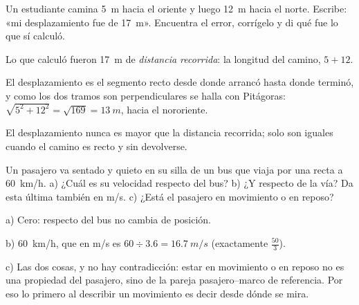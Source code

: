 \documentclass[11pt]{article}
\begin{document}
\begin{preguntas}
\pregunta[1.25] Un estudiante camina \qty{5}{m} hacia el oriente y luego \qty{12}{m} hacia el
norte. Escribe: «mi desplazamiento fue de \qty{17}{m}». Encuentra el error, corrígelo y di qué
fue lo que sí calculó.
\begin{solucion}[4.5cm]
Lo que calculó fueron \qty{17}{m} de \emph{distancia recorrida}: la longitud del camino,
$5 + 12$.

El desplazamiento es el segmento recto desde donde arrancó hasta donde terminó, y como los dos
tramos son perpendiculares se halla con Pitágoras:
$\sqrt{5^2 + 12^2} = \sqrt{169} = \qty{13}{m}$, hacia el nororiente.

El desplazamiento nunca es mayor que la distancia recorrida; solo son iguales cuando el camino
es recto y sin devolverse.
\end{solucion}

\pregunta[1] Un pasajero va sentado y quieto en su silla de un bus que viaja por una recta a
\qty{60}{km/h}. a) ¿Cuál es su velocidad respecto del bus? b) ¿Y respecto de la vía? Da esta
última también en \unit{m/s}. c) ¿Está el pasajero en movimiento o en reposo?
\begin{solucion}[4.5cm]
a) Cero: respecto del bus no cambia de posición.

b) \qty{60}{km/h}, que en \unit{m/s} es $60 \div \num{3,6} = \qty{16,7}{m/s}$ (exactamente
$\frac{50}{3}$).

c) Las dos cosas, y no hay contradicción: estar en movimiento o en reposo no es una propiedad
del pasajero, sino de la pareja pasajero–marco de referencia. Por eso lo primero al describir
un movimiento es decir desde dónde se mira.
\end{solucion}

\end{preguntas}
\end{document}
